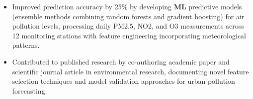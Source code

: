 
\begin{itemize}[topsep=0pt]
  \item Improved prediction accuracy by 25\% by developing \textbf{ML} predictive models (ensemble methods combining random forests and gradient boosting) for air pollution levels, processing daily PM2.5, NO2, and O3 measurements across 12 monitoring stations with feature engineering incorporating meteorological patterns.
  \item Contributed to published research by co-authoring academic paper and scientific journal article in environmental research, documenting novel feature selection techniques and model validation approaches for urban pollution forecasting.
\end{itemize}
